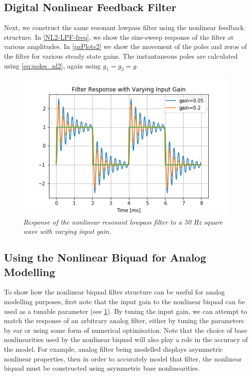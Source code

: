 \documentclass[twoside,a4paper]{article}
\begin{document}
\subsection{Digital Nonlinear Feedback Filter}
%
Next, we construct the same resonant lowpass filter
using the nonlinear feedback structure. In \cref{NL2-LPF-freq},
we show the sine-sweep response of the filter at
various amplitudes. In \cref{pzPlots2} we show the movement of the
poles and zeros of the filter for various steady state gains. The
instantaneous poles are calculated using \cref{eq:poles_nl2}, again
using $g_1 = g_2 = g$.
%
\begin{figure}[ht]
    \center
    \includegraphics[width=\linewidth]{../Pics/50-Hz_Response.png}
    \caption{\label{50hz}{\it Response of the nonlinear resonant lowpass
                            filter to a 50 Hz square wave with varying input gain.}}
\end{figure}
%
\subsection{Using the Nonlinear Biquad for Analog Modelling}
%
To show how the nonlinear biquad filter structure can be useful
for analog modelling purposes, first note that the input gain to
the nonlinear biquad can be used as a tunable parameter (see \cref{50hz}).
\newline\newline
%
By tuning the input gain, we can attempt to match the response of an
arbitrary analog filter, either by tuning the parameters by ear
or using some form of numerical optimisation. Note that the choice
of base nonlinearities used by the nonlinear biquad will also play a
role in the accuracy of the model. For example, analog filter being
modelled displays asymmetric nonlinear properties, then in order
to accurately model that filter, the nonlinear biquad must be constructed
using asymmetric base nonlinearities.
%
\end{document}
